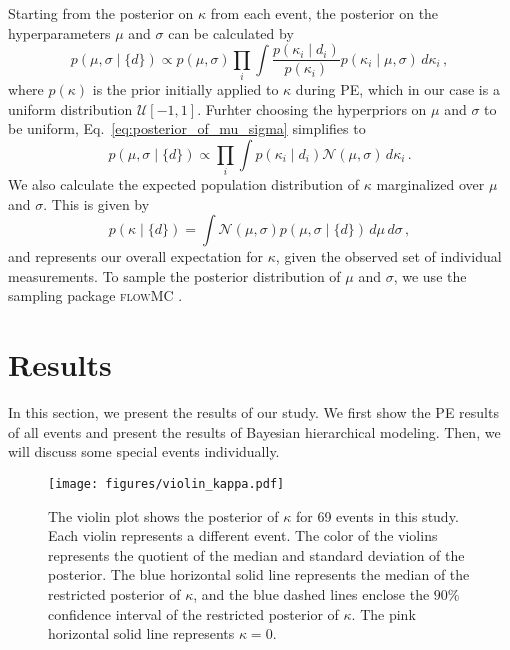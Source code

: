 \documentclass[aps,prd,twocolumn,superscriptaddress,preprintnumbers,floatfix,nofootinbib]{revtex4-2}
\begin{document}
Starting from the posterior on $\kappa$ from each event, the posterior on the hyperparameters $\mu$ and $\sigma$ can be calculated by
\begin{equation}
    p(\mu,\sigma \mid \{d\})\propto p(\mu,\sigma)\prod_{i}\int\frac{p(\kappa_i\mid d_i)}{p(\kappa_i)}p(\kappa_i\mid\mu,\sigma)\,d\kappa_i\,,
    \label{eq:posterior_of_mu_sigma}
\end{equation}
where $p(\kappa)$ is the prior initially applied to $\kappa$ during \ac{PE}, which in our case is a uniform distribution $\mathcal{U}[-1,1]$.
Furhter choosing the hyperpriors on $\mu$ and $\sigma$ to be uniform, Eq.~\eqref{eq:posterior_of_mu_sigma} simplifies to
\begin{equation}
    p(\mu,\sigma\mid\{d\})\propto\prod_{i}\int p(\kappa_i\mid d_i)\mathcal{N}(\mu,\sigma)\,d\kappa_i\,.
\end{equation}
%
We also calculate the expected population distribution of $\kappa$ marginalized over $\mu$ and $\sigma$.
This is given by
\begin{equation}
            p(\kappa\mid \{d\})=\int \mathcal{N}(\mu,\sigma)p(\mu,\sigma\mid \{d\})\,d\mu\,d\sigma\, , 
    \label{eq:generic_posterior}
\end{equation}
and represents our overall expectation for $\kappa$, given the observed set of individual measurements.
To sample the posterior distribution of $\mu$ and $\sigma$, we use the sampling package \textsc{flowMC} \citep{flowMC}.

\section{Results}
\label{sec:Results}
In this section, we present the results of our study.
We first show the PE results of all events and present the results of Bayesian hierarchical modeling.
Then, we will discuss some special events individually.

\begin{figure*}
    \texttt{[image: figures/violin\_kappa.pdf]}
    \caption{
        The violin plot shows the posterior of $\kappa$ for 69 events in this study.
        Each violin represents a different event.
        The color of the violins represents the quotient of the median and standard deviation of the posterior.
        The blue horizontal solid line represents the median of the restricted posterior of $\kappa$, and the blue dashed lines enclose the $90\%$ confidence interval of the restricted posterior of $\kappa$.
        The pink horizontal solid line represents $\kappa=0$.
    }
    \label{fig:violin_kappa}
\end{figure*}
\end{document}
